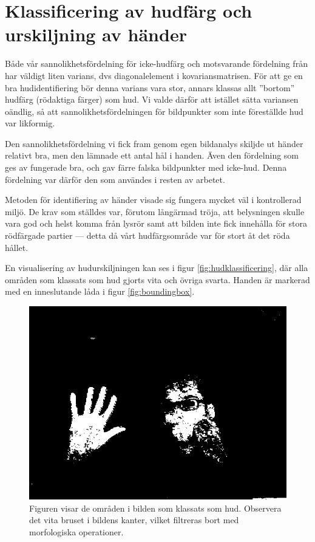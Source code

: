 \documentclass[../rapport_MVEX01-11-05]{subfiles}
\begin{document}
\section{Klassificering av hudfärg och urskiljning av händer}
Både vår sannolikhetsfördelning för icke-hudfärg och motsvarande
fördelning från  har väldigt liten varians,
dvs diagonalelement i kovariansmatrisen. För att ge en bra
hudidentifiering bör denna varians vara stor, annars klassas allt
''bortom'' hudfärg (rödaktiga färger) som hud. Vi valde därför att
istället sätta variansen oändlig, så att sannolikhetsfördelningen för
bildpunkter som inte föreställde hud var likformig.

Den sannolikhetsfördelning vi fick fram genom egen bildanalys skiljde
ut händer relativt bra, men den lämnade ett antal hål i handen. Även
den fördelning som ges av  fungerade bra, och
gav färre falska bildpunkter med icke-hud. Denna fördelning var därför den som
användes i resten av arbetet. 

Metoden för identifiering av händer visade sig fungera mycket väl i
kontrollerad miljö. De krav som ställdes var, förutom långärmad
tröja, att belysningen skulle vara god och helst komma från lysrör
samt att bilden inte fick innehålla för stora rödfärgade partier --- detta
då vårt hudfärgsområde var för stort åt det röda hållet. 

En visualisering av hudurskiljningen kan ses i figur
\vref{fig:hudklassificering}, där alla områden som klassats som hud
gjorts vita och övriga svarta. Handen är markerad med en inneslutande
låda i figur \vref{fig:boundingbox}.

\begin{figure}
  \centering
  \includegraphics[width=0.9\columnwidth]{bilder/whiteskin}
  \caption{Figuren visar de områden i bilden som klassats som hud.
  Observera det vita bruset i bildens kanter, vilket filtreras bort med
  morfologiska operationer.}
  \label{fig:hudklassificering}
\end{figure}
\end{document}
